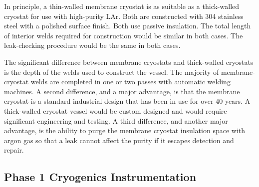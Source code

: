 In principle, a thin-walled membrane cryostat is as suitable as a thick-walled cryostat
for use with high-purity LAr. 
Both are constructed with 304 stainless steel with a polished surface finish.
Both use passive insulation. 
The total length of interior welds required for construction would be similar in both cases.
The leak-checking procedure would be the same in both cases.

The significant difference between membrane cryostats and thick-walled cryostats is
the depth of the welds used to construct the vessel.  
The majority of membrane-cryostat welds are completed in one or two passes with 
automatic welding machines. 
A second difference, and a major advantage, is that the membrane cryostat is a standard
industrial design that has been in use for over 40 years. 
A thick-walled cryostat vessel would be custom designed and would require significant 
engineering and testing. 
A third difference, and another major advantage, is the ability to purge the membrane 
cryostat insulation space with argon gas so that a leak cannot affect the purity if 
it escapes detection and repair. 





\subsection {Phase 1 Cryogenics Instrumentation}

